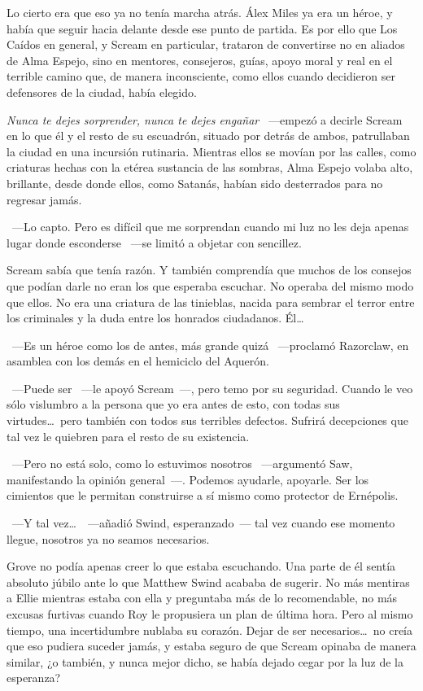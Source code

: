 Lo cierto era que eso ya no tenía marcha atrás. Álex Miles ya era un héroe, y había que seguir hacia delante desde ese punto de partida. Es por ello que Los Caídos en general, y Scream en particular, trataron de convertirse no en aliados de Alma Espejo, sino en mentores, consejeros, guías, apoyo moral y real en el terrible camino que, de manera inconsciente, como ellos cuando decidieron ser defensores de la ciudad, había elegido.

\emph{Nunca te dejes sorprender, nunca te dejes engañar} ~---empezó a decirle Scream en lo que él y el resto de su escuadrón, situado por detrás de ambos, patrullaban la ciudad en una incursión rutinaria. Mientras ellos se movían por las calles, como criaturas hechas con la etérea sustancia de las sombras, Alma Espejo volaba alto, brillante, desde donde ellos, como Satanás, habían sido desterrados para no regresar jamás.

~---Lo capto. Pero es difícil que me sorprendan cuando mi luz no les deja apenas lugar donde esconderse ~---se limitó a objetar con sencillez.

Scream sabía que tenía razón. Y también comprendía que muchos de los consejos que podían darle no eran los que esperaba escuchar. No operaba del mismo modo que ellos. No era una criatura de las tinieblas, nacida para sembrar el terror entre los criminales y la duda entre los honrados ciudadanos. Él\dots

~---Es un héroe como los de antes, más grande quizá ~---proclamó Razorclaw, en asamblea con los demás en el hemiciclo del Aquerón.

~---Puede ser ~---le apoyó Scream~---, pero temo por su seguridad. Cuando le veo sólo vislumbro a la persona que yo era antes de esto, con todas sus virtudes\dots\ pero también con todos sus terribles defectos. Sufrirá decepciones que tal vez le quiebren para el resto de su existencia.

~---Pero no está solo, como lo estuvimos nosotros ~---argumentó Saw, manifestando la opinión general~---. Podemos ayudarle, apoyarle. Ser los cimientos que le permitan construirse a sí mismo como protector de Ernépolis.

~---Y tal vez\dots\ ~---añadió Swind, esperanzado~--- tal vez cuando ese momento llegue, nosotros ya no seamos necesarios.

Grove no podía apenas creer lo que estaba escuchando. Una parte de él sentía absoluto júbilo ante lo que Matthew Swind acababa de sugerir. No más mentiras a Ellie mientras estaba con ella y preguntaba más de lo recomendable, no más excusas furtivas cuando Roy le propusiera un plan de última hora. Pero al mismo tiempo, una incertidumbre nublaba su corazón. Dejar de ser necesarios\dots\ no creía que eso pudiera suceder jamás, y estaba seguro de que Scream opinaba de manera similar, ¿o también, y nunca mejor dicho, se había dejado cegar por la luz de la esperanza?

